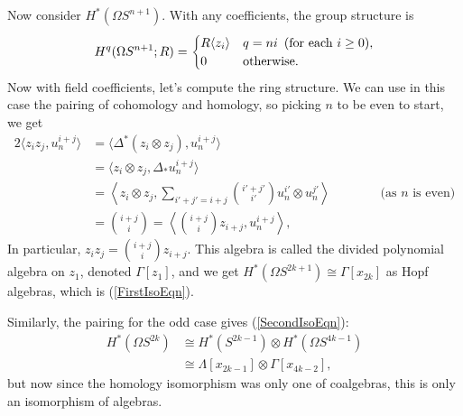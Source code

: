 \documentclass{article}
\newcommand{\Loops}{\Omega}
\theoremstyle{definition}
\begin{document}
Now consider $H^* (\Loops S^{n+1})$.  With any coefficients, the group structure is
\[
H^q(\Loops S^{n+1}; R) = \begin{cases} R \langle z_i \rangle & q=ni\textup{ \,(for each $i\geq0$)}, \\ 0 & \mathrm{otherwise}. \end{cases}
\]
Now with field coefficients, let's compute the ring structure.  We can use in this case the pairing of cohomology and homology, so picking $n$ to be even to start, we get
\begin{alignat*}{2}
\langle z_i z_j, u_n^{i+j} \rangle & = \langle \Delta^*(z_i \otimes z_j), u_n^{i+j} \rangle&\qquad& \\
& = \langle z_i \otimes z_j, \Delta_* u_n^{i+j} \rangle \\
& = \left\langle z_i \otimes z_j, \sum_{i'+j'=i+j} {\textstyle\binom{i'+j'}{i'}} u_n^{i'} \otimes u_n^{j'} \right\rangle&&\text{\ (as $n$ is even)} \\
& = {\textstyle\binom{i+j}{i}} = \left\langle {\textstyle\binom{i+j}{i}} z_{i+j}, u_n^{i+j} \right\rangle,
\end{alignat*}
In particular, $z_i z_j = \binom{i+j}{i} z_{i+j}$. This algebra is called the divided polynomial algebra on $z_1$, denoted $\Gamma[z_1]$, and we get $H^* (\Loops S^{2k+1}) \cong \Gamma[x_{2k}]$ as Hopf algebras, which is (\ref{FirstIsoEqn}).

Similarly, the pairing for the odd case gives (\ref{SecondIsoEqn}):
\begin{align*}
H^* (\Loops S^{2k}) & \cong H^* (S^{2k-1}) \otimes H^* (\Loops S^{4k-1}) \\
& \cong \Lambda[x_{2k-1}] \otimes \Gamma[x_{4k-2}],
\end{align*}
but now since the homology isomorphism was only one of coalgebras, this is only an isomorphism of algebras.
\end{document}

